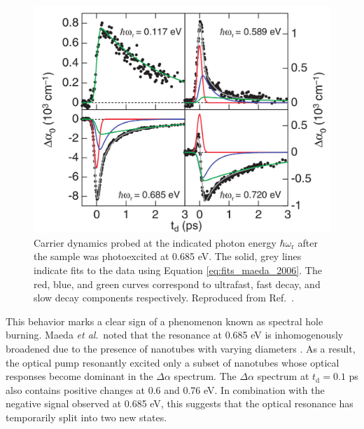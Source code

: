 \begin{figure}[H]
	\centering
	\includegraphics[scale=1.2]{images/chapter_prior_works/dtt_2_maeda_2006}
	\caption{Carrier dynamics probed at the indicated photon energy $\hbar \omega_\text{r}$ after the sample was photoexcited at 0.685 eV. The solid, grey lines indicate fits to the data using Equation \eqref{eq:fits_maeda_2006}. The red, blue, and green curves correspond to ultrafast, fast decay, and slow decay components respectively. Reproduced from Ref.\ \cite{maeda2006gigantic}.}
	\label{fig:dtt_2_maeda_2006}
\end{figure}

This behavior marks a clear sign of a phenomenon known as spectral hole burning. Maeda \textit{et al}.\  noted that the resonance at 0.685 eV is inhomogenously broadened due to the presence of nanotubes with varying diameters \cite{maeda2006gigantic}. As a result, the optical pump resonantly excited only a subset of nanotubes whose optical responses become dominant in the $\Delta \alpha$ spectrum. The $\Delta \alpha$ spectrum at $t_\text{d} = 0.1$ ps also contains positive changes at 0.6 and 0.76 eV. In combination with the negative signal observed at 0.685 eV, this suggests that the optical resonance has temporarily split into two new states.

